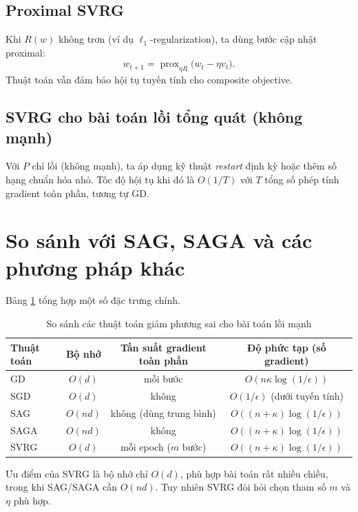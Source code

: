 \documentclass[12pt,a4paper]{report}
\theoremstyle{definition}
\begin{document}
\subsection{Proximal SVRG}
Khi $R(w)$ không trơn (ví dụ $\ell_1$-regularization), ta dùng bước cập nhật proximal:
\begin{equation}
w_{t+1} = \operatorname{prox}_{\eta R}\big(w_t - \eta v_t\big).
\end{equation}
Thuật toán vẫn đảm bảo hội tụ tuyến tính cho composite objective.

\subsection{SVRG cho bài toán lồi tổng quát (không mạnh)}
Với $P$ chỉ lồi (không mạnh), ta áp dụng kỹ thuật \emph{restart} định kỳ hoặc thêm số hạng chuẩn hóa nhỏ. Tốc độ hội tụ khi đó là $O(1/T)$ với $T$ tổng số phép tính gradient toàn phần, tương tự GD.

\section{So sánh với SAG, SAGA và các phương pháp khác}
Bảng \ref{tab:compare} tổng hợp một số đặc trưng chính.
\begin{table}[htbp]
\centering
\caption{So sánh các thuật toán giảm phương sai cho bài toán lồi mạnh}
\label{tab:compare}
\begin{tabular}{|l|c|c|c|}
\hline
\textbf{Thuật toán} & \textbf{Bộ nhớ} & \textbf{Tần suất gradient toàn phần} & \textbf{Độ phức tạp (số gradient)} \\ \hline
GD        & $O(d)$      & mỗi bước & $O(n\kappa\log(1/\epsilon))$ \\
SGD       & $O(d)$      & không     & $O(1/\epsilon)$ (dưới tuyến tính) \\
SAG       & $O(nd)$     & không (dùng trung bình) & $O((n+\kappa)\log(1/\epsilon))$ \\
SAGA      & $O(nd)$     & không     & $O((n+\kappa)\log(1/\epsilon))$ \\
SVRG      & $O(d)$      & mỗi epoch ($m$ bước) & $O((n+\kappa)\log(1/\epsilon))$ \\ \hline
\end{tabular}
\end{table}

Ưu điểm của SVRG là bộ nhớ chỉ $O(d)$, phù hợp bài toán rất nhiều chiều, trong khi SAG/SAGA cần $O(nd)$. Tuy nhiên SVRG đòi hỏi chọn tham số $m$ và $\eta$ phù hợp.
\end{document}

